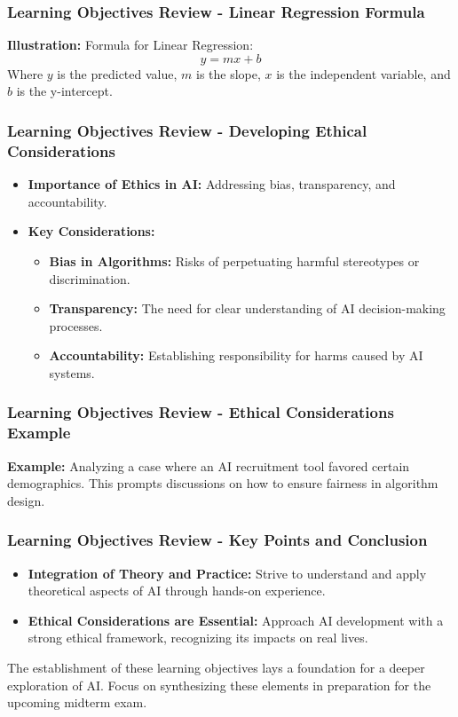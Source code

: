 \documentclass[aspectratio=169]{beamer}
\begin{document}
\begin{frame}[fragile]
    \frametitle{Learning Objectives Review - Linear Regression Formula}
    \textbf{Illustration:} Formula for Linear Regression: 
    \begin{equation} 
    y = mx + b 
    \end{equation}
    Where \(y\) is the predicted value, \(m\) is the slope, \(x\) is the independent variable, and \(b\) is the y-intercept.
\end{frame}

\begin{frame}[fragile]
    \frametitle{Learning Objectives Review - Developing Ethical Considerations}
    \begin{itemize}
        \item \textbf{Importance of Ethics in AI:} Addressing bias, transparency, and accountability.
        \item \textbf{Key Considerations:}
        \begin{itemize}
            \item \textbf{Bias in Algorithms:} Risks of perpetuating harmful stereotypes or discrimination.
            \item \textbf{Transparency:} The need for clear understanding of AI decision-making processes.
            \item \textbf{Accountability:} Establishing responsibility for harms caused by AI systems.
        \end{itemize}
    \end{itemize}
\end{frame}

\begin{frame}[fragile]
    \frametitle{Learning Objectives Review - Ethical Considerations Example}
    \textbf{Example:} Analyzing a case where an AI recruitment tool favored certain demographics. This prompts discussions on how to ensure fairness in algorithm design.
\end{frame}

\begin{frame}[fragile]
    \frametitle{Learning Objectives Review - Key Points and Conclusion}
    \begin{itemize}
        \item \textbf{Integration of Theory and Practice:} Strive to understand and apply theoretical aspects of AI through hands-on experience.
        \item \textbf{Ethical Considerations are Essential:} Approach AI development with a strong ethical framework, recognizing its impacts on real lives.
    \end{itemize}

    The establishment of these learning objectives lays a foundation for a deeper exploration of AI. Focus on synthesizing these elements in preparation for the upcoming midterm exam.
\end{frame}
\end{document}
